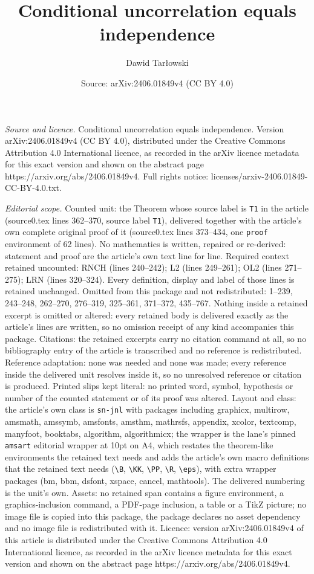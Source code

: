 \documentclass[10pt,a4paper]{amsart}
\title[Conditional uncorrelation equals independence]{Conditional uncorrelation equals independence}
\author{Dawid Tar{\l}owski}
\date{Source: arXiv:2406.01849v4 (CC BY 4.0)}
\begin{document}
\maketitle

\noindent\emph{Source and licence.} Conditional uncorrelation equals independence. Version arXiv:2406.01849v4 (CC BY 4.0), distributed under the Creative Commons Attribution 4.0 International licence, as recorded in the arXiv licence metadata for this exact version and shown on the abstract page https://arxiv.org/abs/2406.01849v4. Full rights notice: licenses/arxiv-2406.01849-CC-BY-4.0.txt.\par\smallskip

\noindent\textit{Editorial scope.} Counted unit: the Theorem whose source label is \texttt{T1} in the article (source0.tex lines 362--370, source label \texttt{T1}), delivered together with the article's own complete original proof of it (source0.tex lines 373--434, one \texttt{proof} environment of 62 lines). No mathematics is written, repaired or re-derived: statement and proof are the article's own text line for line. Required context retained uncounted: RNCH (lines 240--242); L2 (lines 249--261); OL2 (lines 271--275); LRN (lines 320--324). Every definition, display and label of those lines is retained unchanged. Omitted from this package and not redistributed: 1--239, 243--248, 262--270, 276--319, 325--361, 371--372, 435--767. Nothing inside a retained excerpt is omitted or altered: every retained body is delivered exactly as the article's lines are written, so no omission receipt of any kind accompanies this package. Citations: the retained excerpts carry no citation command at all, so no bibliography entry of the article is transcribed and no reference is redistributed. Reference adaptation: none was needed and none was made; every reference inside the delivered unit resolves inside it, so no unresolved reference or citation is produced. Printed slips kept literal: no printed word, symbol, hypothesis or number of the counted statement or of its proof was altered. Layout and class: the article's own class is \texttt{sn-jnl} with packages including graphicx, multirow, amsmath, amssymb, amsfonts, amsthm, mathrsfs, appendix, xcolor, textcomp, manyfoot, booktabs, algorithm, algorithmicx; the wrapper is the lane's pinned \texttt{amsart} editorial wrapper at 10pt on A4, which restates the theorem-like environments the retained text needs and adds the article's own macro definitions that the retained text needs (\texttt{\textbackslash B}, \texttt{\textbackslash KK}, \texttt{\textbackslash PP}, \texttt{\textbackslash R}, \texttt{\textbackslash eps}), with extra wrapper packages (bm, bbm, dsfont, xspace, cancel, mathtools). The delivered numbering is the unit's own. Assets: no retained span contains a figure environment, a graphics-inclusion command, a PDF-page inclusion, a table or a TikZ picture; no image file is copied into this package, the package declares no asset dependency and no image file is redistributed with it. Licence: version arXiv:2406.01849v4 of this article is distributed under the Creative Commons Attribution 4.0 International licence, as recorded in the arXiv licence metadata for this exact version and shown on the abstract page https://arxiv.org/abs/2406.01849v4. 
\end{document}
